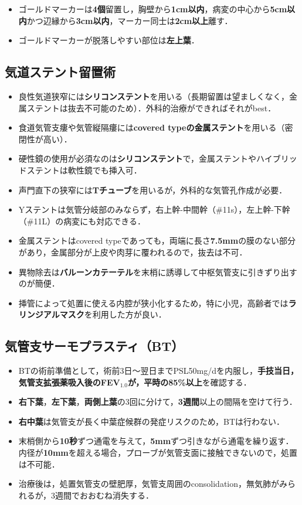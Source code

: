 \begin{itemize}
\item ゴールドマーカーは\textbf{4個}留置し，胸壁から\textbf{1cm以内}，病変の中心から\textbf{5cm以内}かつ辺縁から\textbf{3cm以内}，マーカー同士は\textbf{2cm以上}離す．
\item ゴールドマーカーが脱落しやすい部位は\textbf{左上葉}．

\end{itemize}

\subsection{気道ステント留置術}
\begin{itemize}

\item 良性気道狭窄には\textbf{シリコンステント}を用いる（長期留置は望ましくなく，金属ステントは抜去不可能のため）．外科的治療ができればそれがbest．
\item 食道気管支瘻や気管縦隔瘻には\textbf{covered typeの金属ステント}を用いる（密閉性が高い）．
\item 硬性鏡の使用が必須なのは\textbf{シリコンステント}で，金属ステントやハイブリッドステントは軟性鏡でも挿入可．
\item 声門直下の狭窄には\textbf{Tチューブ}を用いるが，外科的な気管孔作成が必要．
\item Yステントは気管分岐部のみならず，右上幹-中間幹（\#11s），左上幹-下幹（\#11L）の病変にも対応できる．
\item 金属ステントはcovered typeであっても，両端に長さ\textbf{7.5mm}の膜のない部分があり，金属部分が上皮や肉芽に覆われるので，抜去は不可．

\item 異物除去は\textbf{バルーンカテーテル}を末梢に誘導して中枢気管支に引きずり出すのが簡便．
\item 挿管によって処置に使える内腔が狭小化するため，特に小児，高齢者では\textbf{ラリンジアルマスク}を利用した方が良い．
\end{itemize}

\subsection{気管支サーモプラスティ（BT）}
\begin{itemize}
\item BTの術前準備として，術前3日〜翌日までPSL50mg/dを内服し，\textbf{手技当日，気管支拡張薬吸入後のFEV$_{1.0}$が，平時の85\%以上}を確認する．
\item \textbf{右下葉}，\textbf{左下葉}，\textbf{両側上葉}の3回に分けて，\textbf{3週間}以上の間隔を空けて行う．
\item \textbf{右中葉}は気管支が長く中葉症候群の発症リスクのため，BTは行わない．
\item 末梢側から\textbf{10秒}ずつ通電を与えて，\textbf{5mm}ずつ引きながら通電を繰り返す．内径が\textbf{10mm}を超える場合，プローブが気管支面に接触できないので，処置は不可能．
\item 治療後は，処置気管支の壁肥厚，気管支周囲のconsolidation，無気肺がみられるが，3週間でおおむね消失する．
\end{itemize}


